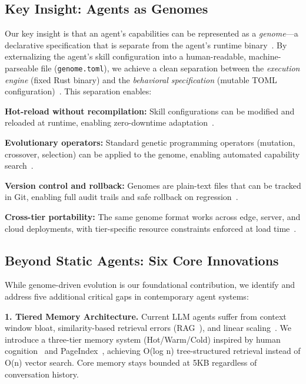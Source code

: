\documentclass{article}
\newcommand{\genome}{\texttt{genome.toml}}
\begin{document}
\subsection{Key Insight: Agents as Genomes}

Our key insight is that an agent's capabilities can be represented as a \textit{genome}---a declarative specification that is separate from the agent's runtime binary~\cite{smith1984reflection}. By externalizing the agent's skill configuration into a human-readable, machine-parseable file (\genome{}), we achieve a clean separation between the \textit{execution engine} (fixed Rust binary) and the \textit{behavioral specification} (mutable TOML configuration)~\cite{meyer1997object}. This separation enables:

\textbf{Hot-reload without recompilation:} Skill configurations can be modified and reloaded at runtime, enabling zero-downtime adaptation~\cite{hewitt1976implementation}.

\textbf{Evolutionary operators:} Standard genetic programming operators (mutation, crossover, selection) can be applied to the genome, enabling automated capability search~\cite{angeline1994genetic}.

\textbf{Version control and rollback:} Genomes are plain-text files that can be tracked in Git, enabling full audit trails and safe rollback on regression~\cite{tan2000git}.

\textbf{Cross-tier portability:} The same genome format works across edge, server, and cloud deployments, with tier-specific resource constraints enforced at load time~\cite{tinyml}.

\subsection{Beyond Static Agents: Six Core Innovations}

While genome-driven evolution is our foundational contribution, we identify and address five additional critical gaps in contemporary agent systems:

\textbf{1. Tiered Memory Architecture.} Current LLM agents suffer from context window bloat, similarity-based retrieval errors (RAG~\cite{lewis2020retrieval}), and linear scaling~\cite{zhong2023token}. We introduce a three-tier memory system (Hot/Warm/Cold) inspired by human cognition~\cite{atkinson1971human} and PageIndex~\cite{vectifyai_pageindex}, achieving O(log n) tree-structured retrieval instead of O(n) vector search. Core memory stays bounded at 5KB regardless of conversation history.
\end{document}
